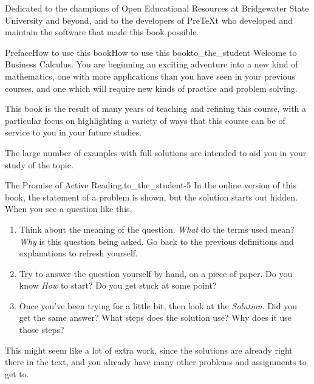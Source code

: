 \documentclass{tufte-book}
\numberwithin{equation}{chapter}
\begin{document}
\thispagestyle{empty}
\begin{center}\Large%
Dedicated to the champions of Open Educational Resources at Bridgewater State University and beyond, and to the developers of PreTeXt who developed and maintain the software that made this book possible.%
\end{center}
\clearpage
%
%
\typeout{************************************************}
\typeout{************************************************}
%
\begin{preface}{Preface}{How to use this book}{}{How to use this book}{}{}{to_the_student}
Welcome to Business Calculus. You are beginning an exciting adventure into a new kind of mathematics, one with more applications than you have seen in your previous courses, and one which will require new kinds of practice and problem solving.%
\par
This book is the result of many years of teaching and refining this course, with a particular focus on highlighting a variety of ways that this course can be of service to you in your future studies.%
\par
The large number of examples with full solutions are intended to aid you in your study of the topic.%
\begin{paragraphs}{The Promise of Active Reading.}{to_the_student-5}%
In the online version of this book, the statement of a problem is shown, but the solution starts out hidden. When you see a question like this,%
\begin{enumerate}
\item{}Think about the meaning of the question.  \emph{What} do the terms used mean?  \emph{Why} is this question being asked.  Go back to the previous definitions and explanations to refresh yourself.%
\item{}Try to answer the question yourself by hand, on a piece of paper.  Do you know \emph{How} to start?  Do you get stuck at some point?%
\item{}Once you've been trying for a little bit, then look at the \emph{Solution}.  Did you get the same answer?  What steps does the solution use?  Why does it use those steps?%
\end{enumerate}
%
\par
This might seem like a lot of extra work, since the solutions are already right there in the text, and you already have many other problems and assignments to get to.%

\end{paragraphs}
\end{preface}
\end{document}
